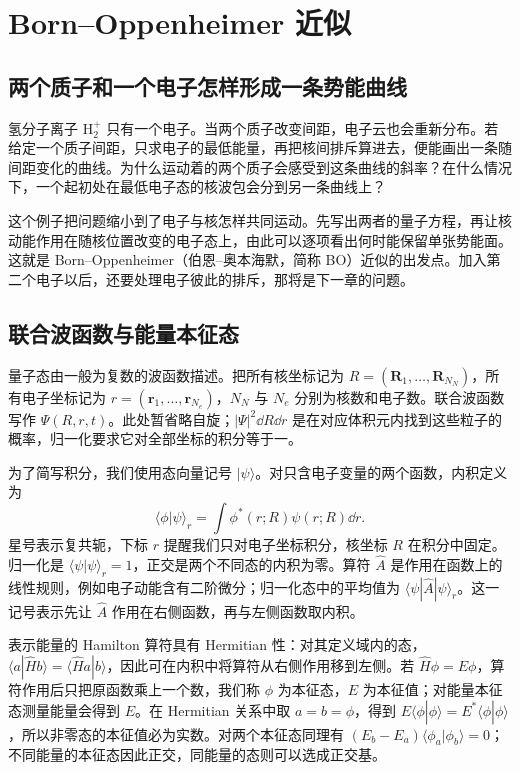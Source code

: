 \chapter{Born--Oppenheimer 近似}\label{bo:chapter}
\section{两个质子和一个电子怎样形成一条势能曲线}
氢分子离子 $\mathrm H_2^+$ 只有一个电子。当两个质子改变间距，电子云也会重新分布。若给定一个质子间距，只求电子的最低能量，再把核间排斥算进去，便能画出一条随间距变化的曲线。为什么运动着的两个质子会感受到这条曲线的斜率？在什么情况下，一个起初处在最低电子态的核波包会分到另一条曲线上？

这个例子把问题缩小到了电子与核怎样共同运动。先写出两者的量子方程，再让核动能作用在随核位置改变的电子态上，由此可以逐项看出何时能保留单张势能面。这就是 Born--Oppenheimer（伯恩--奥本海默，简称 BO）近似的出发点。加入第二个电子以后，还要处理电子彼此的排斥，那将是下一章的问题。

\section{联合波函数与能量本征态}
量子态由一般为复数的波函数描述。把所有核坐标记为 $R=(\bm R_1,\ldots,\bm R_{N_N})$，所有电子坐标记为 $r=(\bm r_1,\ldots,\bm r_{N_e})$，$N_N$ 与 $N_e$ 分别为核数和电子数。联合波函数写作 $\Psi(R,r,t)$。此处暂省略自旋；$|\Psi|^2\dd R\dd r$ 是在对应体积元内找到这些粒子的概率，归一化要求它对全部坐标的积分等于一。

为了简写积分，我们使用态向量记号 $|\psi\rangle$。对只含电子变量的两个函数，内积定义为
\begin{equation}
\langle\phi|\psi\rangle_r=\int\phi^*(r;R)\psi(r;R)\dd r.
\end{equation}
星号表示复共轭，下标 $r$ 提醒我们只对电子坐标积分，核坐标 $R$ 在积分中固定。归一化是 $\langle\psi|\psi\rangle_r=1$，正交是两个不同态的内积为零。算符 $\hat A$ 是作用在函数上的线性规则，例如电子动能含有二阶微分；归一化态中的平均值为 $\langle\psi|\hat A|\psi\rangle_r$。这一记号表示先让 $\hat A$ 作用在右侧函数，再与左侧函数取内积。

表示能量的 Hamilton 算符具有 Hermitian 性：对其定义域内的态，$\langle a|\hat H b\rangle=\langle\hat H a|b\rangle$，因此可在内积中将算符从右侧作用移到左侧。若 $\hat H\phi=E\phi$，算符作用后只把原函数乘上一个数，我们称 $\phi$ 为本征态，$E$ 为本征值；对能量本征态测量能量会得到 $E$。在 Hermitian 关系中取 $a=b=\phi$，得到 $E\langle\phi|\phi\rangle=E^*\langle\phi|\phi\rangle$，所以非零态的本征值必为实数。对两个本征态同理有 $(E_b-E_a)\langle\phi_a|\phi_b\rangle=0$；不同能量的本征态因此正交，同能量的态则可以选成正交基。

